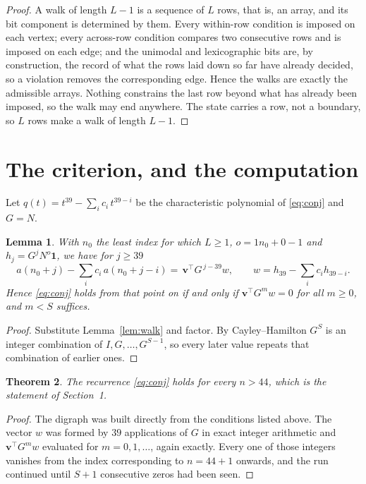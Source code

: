 \documentclass[11pt,a4paper]{article}
\theoremstyle{plain}
\newtheorem{theorem}{Theorem}
\newtheorem{lemma}[theorem]{Lemma}
\theoremstyle{definition}
\begin{document}
\begin{proof}
A walk of length $L-1$ is a sequence of $L$ rows, that is, an array, and its bit component
is determined by them. Every within-row condition is imposed on each vertex; every
across-row condition compares two consecutive rows and is imposed on each edge; and the
unimodal and lexicographic bits are, by construction, the record of what the rows laid down
so far have already decided, so a violation removes the corresponding edge. Hence the walks
are exactly the admissible arrays. Nothing constrains the last row beyond what has already
been imposed, so the walk may end anywhere. The state carries a row, not a boundary, so
$L$ rows make a walk of length $L-1$.
\end{proof}

\section{The criterion, and the computation}

Let $q(t)=t^{39}-\sum_i c_i\,t^{39-i}$ be the characteristic polynomial of
\eqref{eq:conj} and $G=N$.

\begin{lemma}\label{lem:crit}
With $n_0$ the least index for which $L\ge1$, $o=1n_0+0-1$ and
$h_j=G^{j}N^{o}\mathbf{1}$, we have for $j\ge39$
\[
a(n_0+j)-\sum_i c_i\,a(n_0+j-i)=\,\mathbf{v}^{\!\top}G^{\,j-39}w,
\qquad w=h_{39}-\sum_i c_ih_{39-i} .
\]
Hence \eqref{eq:conj} holds from that point on if and only if
$\mathbf{v}^{\!\top}G^{m}w=0$ for all $m\ge0$, and $m<S$ suffices.
\end{lemma}

\begin{proof}
Substitute Lemma~\ref{lem:walk} and factor. By Cayley--Hamilton $G^{S}$ is an integer
combination of $I,G,\dots,G^{S-1}$, so every later value repeats that combination of
earlier ones.
\end{proof}

\begin{theorem}
The recurrence \eqref{eq:conj} holds for every $n>44$, which is the statement of
Section~1.
\end{theorem}

\begin{proof}
The digraph was built directly from the conditions listed above. The vector $w$ was formed by
$39$ applications of $G$ in exact integer arithmetic and $\mathbf{v}^{\!\top}G^{m}w$
evaluated for $m=0,1,\dots$, again exactly. Every one of those integers vanishes from the
index corresponding to $n=44+1$ onwards, and the run continued until $S+1$ consecutive
zeros had been seen.
\end{proof}
\end{document}
